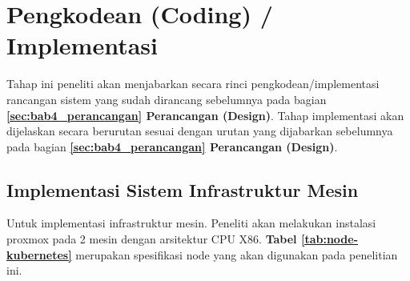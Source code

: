 \section{Pengkodean (Coding) / Implementasi}\label{sec:bab4_implementasi}
Tahap ini peneliti akan menjabarkan secara rinci pengkodean/implementasi
rancangan sistem yang sudah dirancang sebelumnya pada bagian
\textbf{\ref{sec:bab4_perancangan} Perancangan (Design)}. Tahap implementasi
akan dijelaskan secara berurutan sesuai dengan urutan yang dijabarkan
sebelumnya pada bagian \textbf{\ref{sec:bab4_perancangan} Perancangan
  (Design)}.

\subsection{Implementasi Sistem Infrastruktur Mesin}
Untuk implementasi infrastruktur mesin. Peneliti akan melakukan instalasi
proxmox pada 2 mesin dengan arsitektur CPU X86. \textbf{Tabel
  \ref{tab:node-kubernetes}} merupakan spesifikasi node yang akan digunakan pada
penelitian ini.

